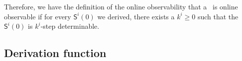Therefore, we have the definition of the online observability that a \BCN\ is online observable if for every $\mathsf{S}^{i}(0)$ we derived, there exists a $k^i\ge 0$ such that the $\mathsf{S}^{i}(0)$ is $k^i$-step determinable.

\subsection{Derivation function}

